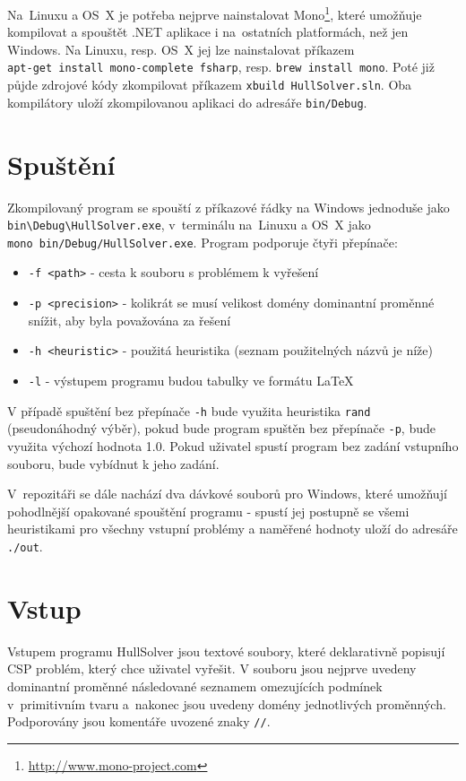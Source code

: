 \documentclass[thesis=B,czech]{FITthesis}[2012/06/26]
\theoremstyle{definition}
\begin{document}
Na~Linuxu a OS~X je potřeba nejprve nainstalovat Mono\footnote{\url{http://www.mono-project.com}}, které umožňuje kompilovat a spouštět .NET aplikace i na~ostatních platformách, než jen Windows. Na Linuxu, resp. OS~X jej lze nainstalovat příkazem \\ \verb|apt-get install mono-complete fsharp|, resp. \verb|brew install mono|. Poté již půjde zdrojové kódy zkompilovat příkazem \verb|xbuild HullSolver.sln|. Oba kompilátory uloží zkompilovanou aplikaci do adresáře \verb|bin/Debug|.

\section{Spuštění}

Zkompilovaný program se spouští z příkazové řádky na Windows jednoduše jako \verb|bin\Debug\HullSolver.exe|, v~terminálu na~Linuxu a OS~X jako \\ \verb|mono bin/Debug/HullSolver.exe|. Program podporuje čtyři přepínače:

\begin{itemize}
    \item \verb|-f <path>| - cesta k souboru s problémem k vyřešení
    \item \verb|-p <precision>| - kolikrát se musí velikost domény dominantní proměnné snížit, aby byla považována za řešení
    \item \verb|-h <heuristic>| - použitá heuristika (seznam použitelných názvů je níže)
    \item \verb|-l| - výstupem programu budou tabulky ve formátu \LaTeX
\end{itemize}

V případě spuštění bez přepínače \verb|-h| bude využita heuristika \verb|rand| (pseudonáhodný výběr), pokud bude program spuštěn bez přepínače \verb|-p|, bude využita výchozí hodnota 1.0. Pokud uživatel spustí program bez zadání vstupního souboru, bude vybídnut k jeho zadání.

V~repozitáři se dále nachází dva dávkové souborů pro Windows, které umožňují pohodlnější opakované spouštění programu - spustí jej postupně se všemi heuristikami pro všechny vstupní problémy a naměřené hodnoty uloží do adresáře \verb|./out|.

\section{Vstup}
Vstupem programu HullSolver jsou textové soubory, které deklarativně popisují CSP problém, který chce uživatel vyřešit. V souboru jsou nejprve uvedeny dominantní proměnné následované seznamem omezujících podmínek v~primitivním tvaru a~nakonec jsou uvedeny domény jednotlivých proměnných. Podporovány jsou komentáře uvozené znaky \verb|//|.
\end{document}
